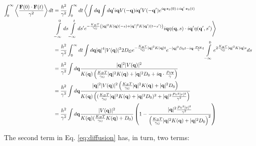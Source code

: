 \documentclass[amsmath,preprintnumbers,10pt,article,notitlepage]{revtex4-1}
\begin{document}
\begin{align}
\int_0^\infty  \left \langle \dfrac{ {\bf F}(0) \cdot {\bf F}(t)}{\gamma^2} \right \rangle dt  & = \dfrac{h^2}{\gamma^2}  \int_0^\infty dt \left \langle \int d{\bf q} \int  d{\bf q}' i{\bf q}  V(-{\bf q}) i{\bf q}' V({-\bf q}') e^{i{\bf q} \cdot {\bf r}_0(0)  + i {\bf q}' \cdot {\bf r}_0(t)} \right . \\ & \left . \int\limits_{-\infty}^0 ds \int\limits_{-\infty}^t ds' e^{-\frac{K_BT}{\gamma_G}\left(|{\bf q}|^2 K({\bf q})(-s)+|{\bf q}'|^2 K({\bf q}')(t-s')\right)} i{\bf q} \eta({\bf q}, s) \cdot  i{\bf q}' \eta({\bf q}', s')  \right \rangle \\
& = \dfrac{h^2}{\gamma^2}  \int_0^\infty dt \int d{\bf q} |{\bf q}|^4  |V({\bf q})|^2 2D_G e^{-\frac{K_BT}{\gamma_G} |{\bf q}|^2 K({\bf q})t} e^{-|{\bf q}|^2 D_0 t - i{\bf q} \cdot \frac{Pe {\bf v}}{\gamma} t} \int\limits_{-\infty}^0 e^{2\frac{K_BT}{\gamma_G} |{\bf q}|^2 K({\bf q})s}ds \\
& = \dfrac{h^2}{\gamma^2}  \int d{\bf q}  \dfrac{ |{\bf q}|^2 |V({\bf q})|^2 } {K({\bf q}) \left( \frac{K_BT}{\gamma_G} |{\bf q}|^2 K({\bf q}) + |{\bf q}|^2D_0 + i{\bf q} \cdot \frac{Pe {\bf v}}{\gamma} \right)}   \\
& = \dfrac{h^2}{\gamma^2}  \int d{\bf q} \dfrac{ |{\bf q}|^2 |V({\bf q})|^2 \left ( \frac{K_BT}{\gamma_G} |{\bf q}|^2 K({\bf q}) + |{\bf q}|^2D_0 \right )} { K({\bf q}) \left( ( \frac{K_BT}{\gamma_G} |{\bf q}|^2 K({\bf q}) +  |{\bf q}|^2 D_0 )^2 + |{\bf q}|^2 \frac{Pe^2 |v|^2}{\gamma^2} \right)} \\
& =  \dfrac{h^2}{\gamma^2}  \int d{\bf q} \dfrac{ |V({\bf q})|^2 } { K({\bf q}) ( \frac{K_BT}{\gamma_G}  K({\bf q}) +  D_0 )} \left( 1- \dfrac{|{\bf q}|^2 \frac{Pe^2 |v|^2}{\gamma^2}}{\left(  \frac{K_BT}{\gamma_G} |{\bf q}|^2 K({\bf q}) +  |{\bf q}|^2 D_0 \right)^2} \right)
\end{align}

The second term in Eq. \ref{eq:diffusion} has, in turn, two terms: 
\end{document}
